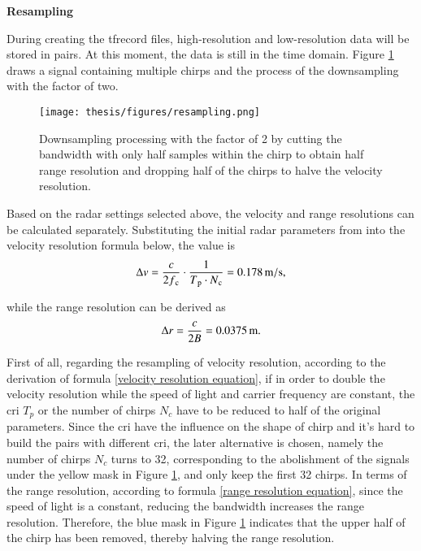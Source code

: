 \begin{spacing}{1.5}
\textbf{\large{Resampling}}
\end{spacing}

During creating the \gls{tfrecord} files, high-resolution and low-resolution data will be stored in pairs. At this moment, the data is still in the time domain. Figure \ref{downsample in time domain with the factor of 2} draws a signal containing multiple chirps and the process of the downsampling with the factor of two.

\begin{figure}
	\centering
	\texttt{[image: thesis/figures/resampling.png]}
	\caption{Downsampling processing with the factor of 2 by cutting the bandwidth with only half samples within the chirp to obtain half range resolution and dropping half of the chirps to halve the velocity resolution.}
	\label{downsample in time domain with the factor of 2}
\end{figure}

Based on the radar settings selected above, the velocity and range resolutions can be calculated separately. Substituting the initial radar parameters from into the velocity resolution formula below, the value is
\begin{equation}
    \centering
    \Delta v = \frac{c}{2f\textsubscript{c}} \cdot \frac{1}{T\textsubscript{p} \cdot N\textsubscript{c}} = 0.178\,\mathrm{m/s},
    \label{velocity resolution equation}
\end{equation}

while the range resolution can be derived as
\begin{equation}
    \centering
    \Delta r = \frac{c}{2B} = 0.0375\,\mathrm{m}.
    \label{range resolution equation}
\end{equation}

First of all, regarding the resampling of velocity resolution, according to the derivation of formula \ref{velocity resolution equation}, if in order to double the velocity resolution while the speed of light and carrier frequency are constant, the \gls{cri} $T_p$ or the number of chirps $N_c$ have to be reduced to half of the original parameters. Since the \gls{cri} have the influence on the shape of chirp and it's hard to build the pairs with different \gls{cri}, the later alternative is chosen, namely the number of chirps $N_c$ turns to 32, corresponding to the abolishment of the signals under the yellow mask in Figure \ref{downsample in time domain with the factor of 2}, and only keep the first 32 chirps. In terms of the range resolution, according to formula \ref{range resolution equation}, since the speed of light is a constant, reducing the bandwidth increases the range resolution. Therefore, the blue mask in Figure \ref{downsample in time domain with the factor of 2} indicates that the upper half of the chirp has been removed, thereby halving the range resolution.

